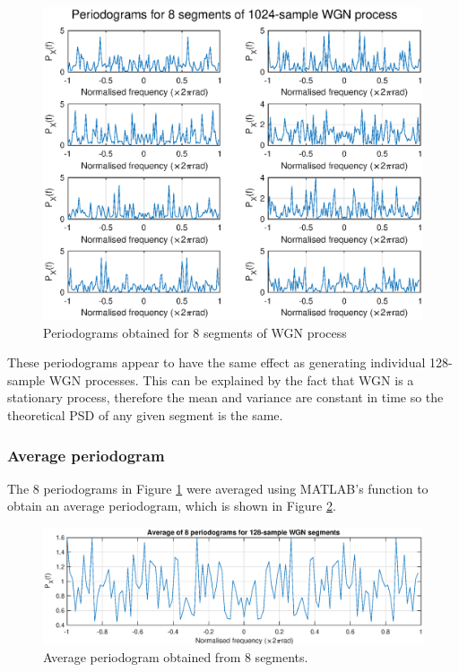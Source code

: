 \begin{figure}[H]
    \centering
    \includegraphics[width=16cm]{assignment3figs/pgms_compound.eps}
    \caption{Periodograms obtained for 8 segments of WGN process}
    \label{fig:pgms_compound}
\end{figure}

\noindent
These periodograms appear to have the same effect as generating individual 128-sample WGN processes. This can be explained by the fact that WGN is a stationary process, therefore the mean and variance are constant in time so the theoretical PSD of any given segment is the same.

\subsubsection{Average periodogram}

The 8 periodograms in Figure \ref{fig:pgms_compound} were averaged using MATLAB's  function to obtain an average periodogram, which is shown in Figure \ref{fig:avg_pgm}.

\begin{figure}[H]
    \centering
    \includegraphics[width=13cm]{assignment3figs/avg_pgm.eps}
    \caption{Average periodogram obtained from 8 segments.}
    \label{fig:avg_pgm}
\end{figure}

